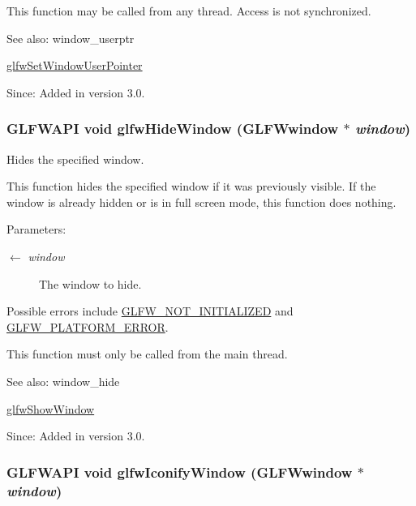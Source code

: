 This function may be called from any thread. Access is not synchronized.

\begin{Desc}
\item[See also:]window\_\-userptr 

\hyperlink{group__window_gcc9e68faee3c1763b54cd9bc405cf43e}{glfwSetWindowUserPointer}\end{Desc}
\begin{Desc}
\item[Since:]Added in version 3.0. \end{Desc}
\hypertarget{group__window_ga17e287d521544bdeceafa09ac036e20}{
\subsubsection[glfwHideWindow]{\setlength{\rightskip}{0pt plus 5cm}GLFWAPI void glfwHideWindow ({\bf GLFWwindow} $\ast$ {\em window})}}
\label{group__window_ga17e287d521544bdeceafa09ac036e20}


Hides the specified window. 

This function hides the specified window if it was previously visible. If the window is already hidden or is in full screen mode, this function does nothing.

\begin{Desc}
\item[Parameters:]
\begin{description}
\item[\mbox{$\leftarrow$} {\em window}]The window to hide.\end{description}
\end{Desc}
Possible errors include \hyperlink{group__errors_g2374ee02c177f12e1fa76ff3ed15e14a}{GLFW\_\-NOT\_\-INITIALIZED} and \hyperlink{group__errors_gd44162d78100ea5e87cdd38426b8c7a1}{GLFW\_\-PLATFORM\_\-ERROR}.

This function must only be called from the main thread.

\begin{Desc}
\item[See also:]window\_\-hide 

\hyperlink{group__window_g7945bcdff9e5e058cf36505d6873ed8c}{glfwShowWindow}\end{Desc}
\begin{Desc}
\item[Since:]Added in version 3.0. \end{Desc}
\hypertarget{group__window_g24274e3c6ecd44e11fec5e6b66e4d7f3}{
\subsubsection[glfwIconifyWindow]{\setlength{\rightskip}{0pt plus 5cm}GLFWAPI void glfwIconifyWindow ({\bf GLFWwindow} $\ast$ {\em window})}}
\label{group__window_g24274e3c6ecd44e11fec5e6b66e4d7f3}


